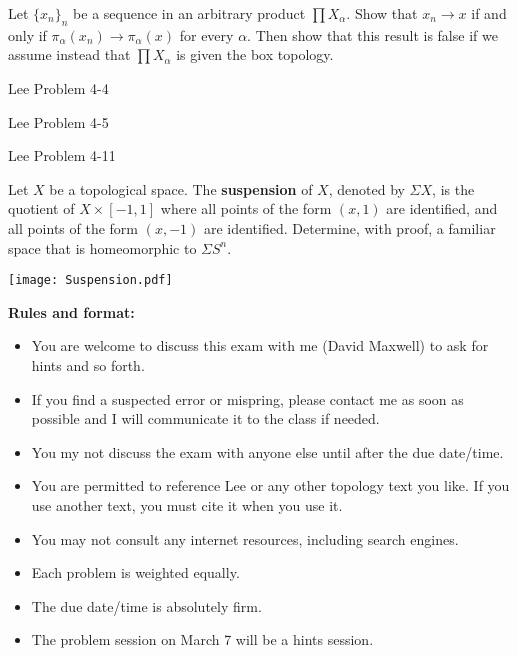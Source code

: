 \documentclass{homework651}
\def\Reals{\mathbb{R}}
\begin{document}
\begin{problems}

\problem Let $\{x_n\}_n$ be a sequence in an arbitrary
product $\prod X_\alpha$. Show that $x_n\to x$ if 
and only if $\pi_\alpha(x_n)\to \pi_\alpha(x)$ for every $\alpha$.
Then show that this result is false if we assume
instead that $\prod X_\alpha$ is given the box topology.

\problem Lee Problem 4-4

\problem Lee Problem 4-5

\problem Lee Problem 4-11

\problem Let $X$ be a topological space.  The {\bf suspension} of $X$, denoted by
$\Sigma X$, is the quotient of $X\times [-1,1]$ where all points of the form $(x,1)$
are identified, and all points of the form $(x,-1)$ are identified.  
Determine, with proof, a familiar space that is homeomorphic to $\Sigma S^n$.

\texttt{[image: Suspension.pdf]}

\newpage
{\bf  Rules and format:}
\begin{itemize}

\item You are welcome to discuss this exam with me (David Maxwell) to ask for hints and so forth.
\item  If you find a suspected error or mispring, please contact me as soon as possible and I will
communicate it to the class if needed.
\item You my not discuss the exam with anyone else until after the due date/time.
\item You are permitted to reference Lee or any other topology text you like.  If you use
another text, you must cite it when you use it.
\item You may not consult any internet resources, including search engines.
\item Each problem is weighted equally.
\item The due date/time is absolutely firm.
\item The problem session on March 7 will be a hints session.
\end{itemize}



\end{problems}
\end{document}
